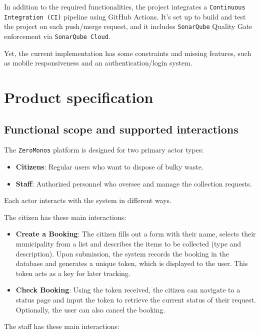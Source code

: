 \documentclass[code,math]{relatorio-deti}
\begin{document}
In addition to the required functionalities, the project integrates a \texttt{Continuous Integration (CI)} pipeline using GitHub Actions. It's set up to build and test the project on each push/merge request, and it includes \texttt{SonarQube} Quality Gate enforcement via \texttt{SonarQube Cloud}.

Yet, the current implementation has some constraints and missing features, such as mobile responsiveness and an authentication/login system.

\chapter{Product specification}
\section{Functional scope and supported interactions}

The \texttt{ZeroMonos} platform is designed for two primary actor types:

\begin{itemize}
	\item \textbf{Citizens}: Regular users who want to dispose of bulky waste.
	\item  \textbf{Staff}: Authorized personnel who oversee and manage the collection requests.
\end{itemize}

Each actor interacts with the system in different ways.

The citizen has these main interactions:

\begin{itemize}
    \item \textbf{Create a Booking}: The citizen fills out a form with their name, selects their municipality from a list and describes the items to be collected (type and description). Upon submission, the system records the booking in the database and generates a unique token, which is displayed to the user. This token acts as a key for later tracking.
    \item \textbf{Check Booking}: Using the token received, the citizen can navigate to a status page and input the token to retrieve the current status of their request. Optionally, the user can also cancel the booking.
\end{itemize}

The staff has these main interactions:
\end{document}
